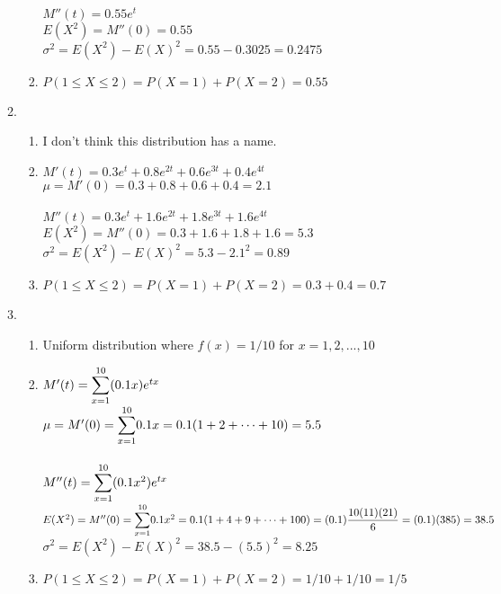 \documentclass{article}
\begin{document}
\begin{enumerate}
\begin{enumerate}
\begin{enumerate}
	  $M''(t) = 0.55e^t$ \\
	  $E(X^2) = M''(0) = 0.55$ \\
	  $\sigma^2 = E(X^2) - E(X)^2 = 0.55 - 0.3025 = 0.2475$
	 \item
	  $P(1 \le X \le 2) = P(X=1) + P(X=2) = 0.55$
	\end{enumerate}
       \item
	\begin{enumerate}
	 \item I don't think this distribution has a name. 
	 \item
	  $M'(t) = 0.3e^t + 0.8e^{2t} + 0.6e^{3t} + 0.4e^{4t}$  \\
	  $\mu = M'(0) = 0.3 + 0.8 + 0.6 + 0.4 = 2.1$ \\
	  \\
	  $M''(t) = 0.3e^t + 1.6e^{2t} + 1.8e^{3t} + 1.6e^{4t}$ \\
	  $E(X^2) = M''(0) = 0.3 + 1.6 + 1.8 + 1.6 = 5.3$ \\
	  $\sigma^2 = E(X^2) - E(X)^2 = 5.3 - 2.1^2 = 0.89$
	 \item
	  $P(1 \le X \le 2) = P(X=1) + P(X=2) = 0.3 + 0.4 = 0.7$
	\end{enumerate}
       \item
	\begin{enumerate}
	 \item Uniform distribution where $f(x) = 1/10$ for $x=1,2,...,10$
	 \item
	  $M'(t) = \mathlarger{\sum}_{x=1}^{10}{(0.1x)e^{tx}}$ \\
	  $\mu = M'(0) = \mathlarger{\sum}_{x=1}^{10}{0.1x} = 0.1(1+2+\cdots+10) = 5.5$ \\
	  \\
	  $M''(t) = \mathlarger{\sum}_{x=1}^{10}{(0.1x^2)e^{tx}}$ \\
	  $E(X^2) = M''(0) = \mathlarger{\sum}_{x=1}^{10}{0.1x^2} = 0.1(1+4+9+\cdots+100)
	      = (0.1)\dfrac{10(11)(21)}{6} = (0.1)(385) = 38.5$ \\
	  $\sigma^2 = E(X^2) - E(X)^2 = 38.5 - (5.5)^2 = 8.25$
	 \item
	  $P(1 \le X \le 2) = P(X=1) + P(X=2) = 1/10 + 1/10 = 1/5$
	\end{enumerate}


      \end{enumerate}

      
    \end{enumerate}
\end{document}
